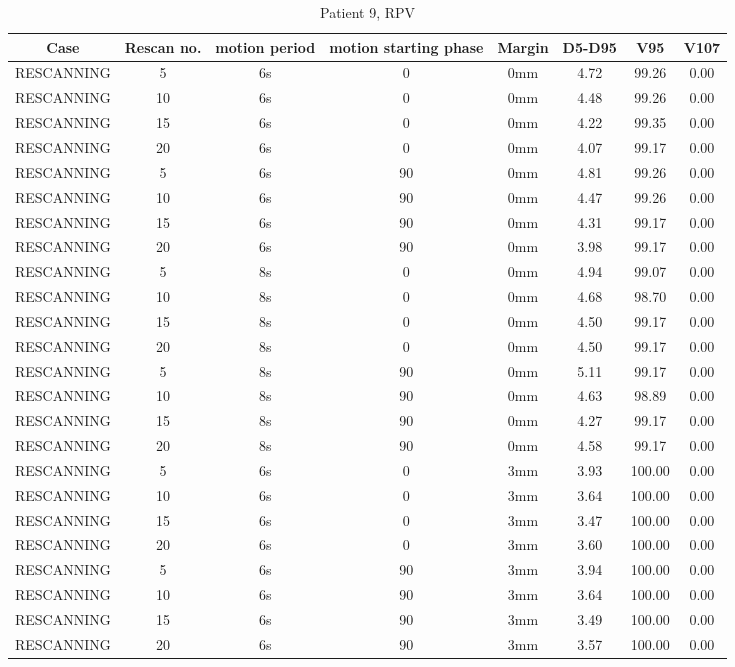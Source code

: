 \begin{table}[H]
  \centering
   \scriptsize 
  \caption{Patient 9, RPV}
  \begin{tabular}{|c|c||c|c|c||c|c|c|}
    \hline\hline
    Case & Rescan no. & motion period & motion starting phase & Margin & D5-D95 & V95 & V107\\
    \hline 
RESCANNING & 5 & 6s & 0 & 0mm & 4.72 & 99.26 & 0.00 \\
RESCANNING & 10 & 6s & 0 & 0mm & 4.48 & 99.26 & 0.00 \\
RESCANNING & 15 & 6s & 0 & 0mm & 4.22 & 99.35 & 0.00 \\
RESCANNING & 20 & 6s & 0 & 0mm & 4.07 & 99.17 & 0.00 \\
RESCANNING & 5 & 6s & 90 & 0mm & 4.81 & 99.26 & 0.00 \\
RESCANNING & 10 & 6s & 90 & 0mm & 4.47 & 99.26 & 0.00 \\
RESCANNING & 15 & 6s & 90 & 0mm & 4.31 & 99.17 & 0.00 \\
RESCANNING & 20 & 6s & 90 & 0mm & 3.98 & 99.17 & 0.00 \\
RESCANNING & 5 & 8s & 0 & 0mm & 4.94 & 99.07 & 0.00 \\
RESCANNING & 10 & 8s & 0 & 0mm & 4.68 & 98.70 & 0.00 \\
RESCANNING & 15 & 8s & 0 & 0mm & 4.50 & 99.17 & 0.00 \\
RESCANNING & 20 & 8s & 0 & 0mm & 4.50 & 99.17 & 0.00 \\
RESCANNING & 5 & 8s & 90 & 0mm & 5.11 & 99.17 & 0.00 \\
RESCANNING & 10 & 8s & 90 & 0mm & 4.63 & 98.89 & 0.00 \\
RESCANNING & 15 & 8s & 90 & 0mm & 4.27 & 99.17 & 0.00 \\
RESCANNING & 20 & 8s & 90 & 0mm & 4.58 & 99.17 & 0.00 \\
RESCANNING & 5 & 6s & 0 & 3mm & 3.93 & 100.00 & 0.00 \\
RESCANNING & 10 & 6s & 0 & 3mm & 3.64 & 100.00 & 0.00 \\
RESCANNING & 15 & 6s & 0 & 3mm & 3.47 & 100.00 & 0.00 \\
RESCANNING & 20 & 6s & 0 & 3mm & 3.60 & 100.00 & 0.00 \\
RESCANNING & 5 & 6s & 90 & 3mm & 3.94 & 100.00 & 0.00 \\
RESCANNING & 10 & 6s & 90 & 3mm & 3.64 & 100.00 & 0.00 \\
RESCANNING & 15 & 6s & 90 & 3mm & 3.49 & 100.00 & 0.00 \\
RESCANNING & 20 & 6s & 90 & 3mm & 3.57 & 100.00 & 0.00 \\

\end{tabular}
\end{table}

